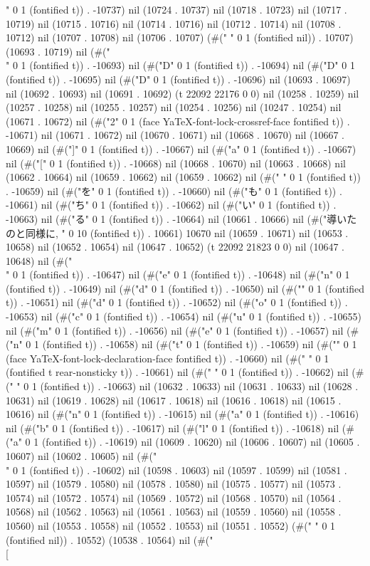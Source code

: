 " 0 1 (fontified t)) . -10737) nil (10724 . 10737) nil (10718 . 10723) nil (10717 . 10719) nil (10715 . 10716) nil (10714 . 10716) nil (10712 . 10714) nil (10708 . 10712) nil (10707 . 10708) nil (10706 . 10707) (#(" " 0 1 (fontified nil)) . 10707) (10693 . 10719) nil (#("\\" 0 1 (fontified t)) . -10693) nil (#("D" 0 1 (fontified t)) . -10694) nil (#("D" 0 1 (fontified t)) . -10695) nil (#("D" 0 1 (fontified t)) . -10696) nil (10693 . 10697) nil (10692 . 10693) nil (10691 . 10692) (t 22092 22176 0 0) nil (10258 . 10259) nil (10257 . 10258) nil (10255 . 10257) nil (10254 . 10256) nil (10247 . 10254) nil (10671 . 10672) nil (#("2" 0 1 (face YaTeX-font-lock-crossref-face fontified t)) . -10671) nil (10671 . 10672) nil (10670 . 10671) nil (10668 . 10670) nil (10667 . 10669) nil (#("]" 0 1 (fontified t)) . -10667) nil (#("a" 0 1 (fontified t)) . -10667) nil (#("[" 0 1 (fontified t)) . -10668) nil (10668 . 10670) nil (10663 . 10668) nil (10662 . 10664) nil (10659 . 10662) nil (10659 . 10662) nil (#(" " 0 1 (fontified t)) . -10659) nil (#("を" 0 1 (fontified t)) . -10660) nil (#("も" 0 1 (fontified t)) . -10661) nil (#("ち" 0 1 (fontified t)) . -10662) nil (#("い" 0 1 (fontified t)) . -10663) nil (#("る" 0 1 (fontified t)) . -10664) nil (10661 . 10666) nil (#("導いたのと同様に, " 0 10 (fontified t)) . 10661) 10670 nil (10659 . 10671) nil (10653 . 10658) nil (10652 . 10654) nil (10647 . 10652) (t 22092 21823 0 0) nil (10647 . 10648) nil (#("\\" 0 1 (fontified t)) . -10647) nil (#("e" 0 1 (fontified t)) . -10648) nil (#("n" 0 1 (fontified t)) . -10649) nil (#("d" 0 1 (fontified t)) . -10650) nil (#("{" 0 1 (fontified t)) . -10651) nil (#("d" 0 1 (fontified t)) . -10652) nil (#("o" 0 1 (fontified t)) . -10653) nil (#("c" 0 1 (fontified t)) . -10654) nil (#("u" 0 1 (fontified t)) . -10655) nil (#("m" 0 1 (fontified t)) . -10656) nil (#("e" 0 1 (fontified t)) . -10657) nil (#("n" 0 1 (fontified t)) . -10658) nil (#("t" 0 1 (fontified t)) . -10659) nil (#("}" 0 1 (face YaTeX-font-lock-declaration-face fontified t)) . -10660) nil (#("
" 0 1 (fontified t rear-nonsticky t)) . -10661) nil (#("
" 0 1 (fontified t)) . -10662) nil (#("
" 0 1 (fontified t)) . -10663) nil (10632 . 10633) nil (10631 . 10633) nil (10628 . 10631) nil (10619 . 10628) nil (10617 . 10618) nil (10616 . 10618) nil (10615 . 10616) nil (#("n" 0 1 (fontified t)) . -10615) nil (#("a" 0 1 (fontified t)) . -10616) nil (#("b" 0 1 (fontified t)) . -10617) nil (#("l" 0 1 (fontified t)) . -10618) nil (#("a" 0 1 (fontified t)) . -10619) nil (10609 . 10620) nil (10606 . 10607) nil (10605 . 10607) nil (10602 . 10605) nil (#("\\" 0 1 (fontified t)) . -10602) nil (10598 . 10603) nil (10597 . 10599) nil (10581 . 10597) nil (10579 . 10580) nil (10578 . 10580) nil (10575 . 10577) nil (10573 . 10574) nil (10572 . 10574) nil (10569 . 10572) nil (10568 . 10570) nil (10564 . 10568) nil (10562 . 10563) nil (10561 . 10563) nil (10559 . 10560) nil (10558 . 10560) nil (10553 . 10558) nil (10552 . 10553) nil (10551 . 10552) (#(" " 0 1 (fontified nil)) . 10552) (10538 . 10564) nil (#("\\[
 
